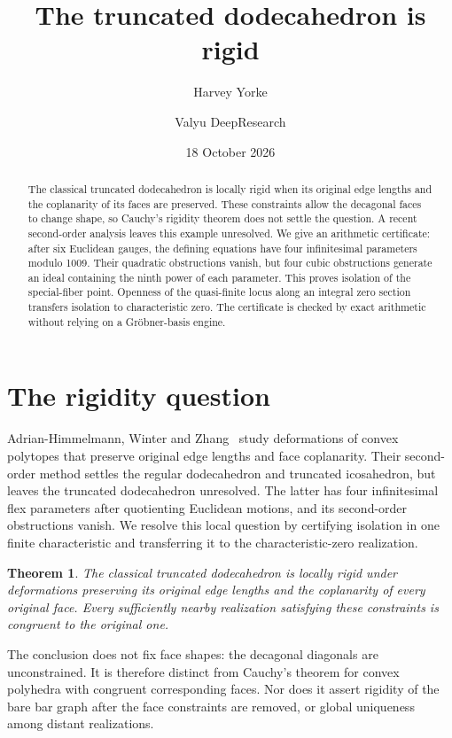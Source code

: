 \documentclass[11pt]{amsart}
\title{The truncated dodecahedron is rigid}
\author{Harvey Yorke}
\author{Valyu DeepResearch}
\date{18 October 2026}
\newtheorem{theorem}{Theorem}[section]
\theoremstyle{remark}
\begin{document}
\raggedbottom
\begin{abstract}
The classical truncated dodecahedron is locally rigid when its original edge lengths and the coplanarity of its faces are preserved. These constraints allow the decagonal faces to change shape, so Cauchy's rigidity theorem does not settle the question. A recent second-order analysis leaves this example unresolved. We give an arithmetic certificate: after six Euclidean gauges, the defining equations have four infinitesimal parameters modulo 1009. Their quadratic obstructions vanish, but four cubic obstructions generate an ideal containing the ninth power of each parameter. This proves isolation of the special-fiber point. Openness of the quasi-finite locus along an integral zero section transfers isolation to characteristic zero. The certificate is checked by exact arithmetic without relying on a Gr\"obner-basis engine.
\end{abstract}
\maketitle
\section{The rigidity question}

Adrian-Himmelmann, Winter and Zhang~\cite{AHWZ2026} study deformations of convex polytopes that preserve original edge lengths and face coplanarity. Their second-order method settles the regular dodecahedron and truncated icosahedron, but leaves the truncated dodecahedron unresolved. The latter has four infinitesimal flex parameters after quotienting Euclidean motions, and its second-order obstructions vanish. We resolve this local question by certifying isolation in one finite characteristic and transferring it to the characteristic-zero realization.

\begin{theorem}\label{thm:main}
The classical truncated dodecahedron is locally rigid under deformations preserving its original edge lengths and the coplanarity of every original face. Every sufficiently nearby realization satisfying these constraints is congruent to the original one.
\end{theorem}

The conclusion does not fix face shapes: the decagonal diagonals are unconstrained. It is therefore distinct from Cauchy's theorem for convex polyhedra with congruent corresponding faces. Nor does it assert rigidity of the bare bar graph after the face constraints are removed, or global uniqueness among distant realizations.
\end{document}
